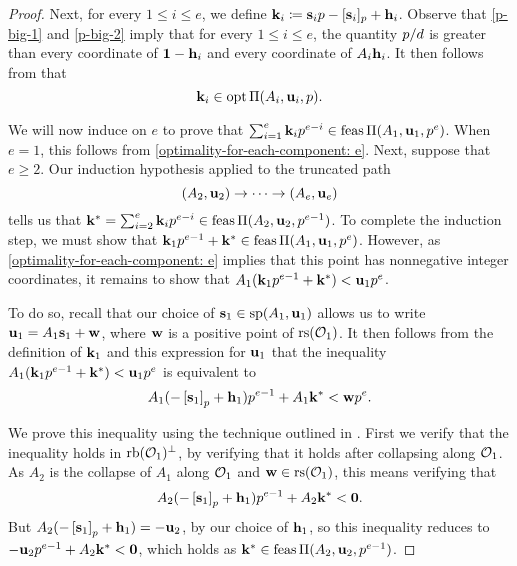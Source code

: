 \documentclass{amsart}
\begin{document}
\begin{proof}
    Next, for every $1 \leq i \leq e$,  we define $\mathbf{k}_i \coloneqq \mathbf{s}_i p - [\mathbf{s}_i]_p + \mathbf{h}_i$.
    Observe that \eqref{p-big-1} and \eqref{p-big-2} imply that for every $1 \leq i \leq e$, the quantity $p/d$ is greater than every coordinate of $\mathbf{1}-\mathbf{h}_i$ and every coordinate of $A_i \mathbf{h}_i$.
    It then follows from  that
    \begin{equation}
       \label{optimality-for-each-component: e}
       \mathbf{k}_i \in \operatorname{opt} \Pi(A_i, \mathbf{u}_i,p).
    \end{equation}

    We will now induce on $e$ to prove that $\sum_{i=1}^e \mathbf{k}_i p^{e-i} \in \operatorname{feas}\Pi(A_1, \mathbf{u}_1, p^e)$.
    When $e = 1$, this follows from \eqref{optimality-for-each-component: e}.
    Next, suppose that $e \geq 2$.
    Our induction hypothesis applied to the truncated path
    \[ (A_2, \mathbf{u}_2) \to \cdots \to (A_e, \mathbf{u}_e) \]
    tells us that $\mathbf{k}^{\ast} = \sum_{i=2}^e \mathbf{k}_i p^{e-i} \in \operatorname{feas} \Pi(A_2, \mathbf{u}_2, p^{e-1})$.
    To complete the induction step, we must show that $\mathbf{k}_1 p^{e-1} + \mathbf{k}^{\ast} \in \operatorname{feas}\Pi(A_1, \mathbf{u}_1, p^e)$.
    However, as \eqref{optimality-for-each-component: e} implies that this point has nonnegative integer coordinates, it remains to show that $A_1 ( \mathbf{k}_1 p^{e-1} + \mathbf{k}^{\ast} ) < \mathbf{u}_1 p^e$.

    To do so, recall that our choice of $\mathbf{s}_1 \in \operatorname{sp}(A_1, \mathbf{u}_1)$ allows us to write $\mathbf{u}_1 = A_1 \mathbf{s}_1 + \mathbf{w}$, where $\mathbf{w}$ is a positive point of $\operatorname{rs}(\mathcal{O}_1)$.
    It then follows from the definition of $\mathbf{k}_1$ and this expression for $\mathbf{u}_1$ that the inequality $A_1 ( \mathbf{k}_1 p^{e-1} + \mathbf{k}^{\ast} ) < \mathbf{u}_1 p^e$ is equivalent to
    \begin{equation}
       \label{target-inequality: e}
       A_1( - \left[ \mathbf{s}_1 \right]_p + \mathbf{h}_1 ) p^{e-1} + A_1\mathbf{k}^{\ast} < \mathbf{w} p^e.
    \end{equation}

    We prove this inequality using the technique outlined in .
    First we verify that the inequality holds in $\operatorname{rb}(\mathcal{O}_1)^{\perp}$, by verifying that it holds after collapsing along $\mathcal{O}_1$.
    As $A_2$ is the collapse of $A_1$ along $\mathcal{O}_1$ and $\mathbf{w}\in \operatorname{rs}(\mathcal{O}_1)$, this means verifying that
    \[A_2( - \left[ \mathbf{s}_1 \right]_p + \mathbf{h}_1 ) p^{e-1} + A_2\mathbf{k}^{\ast} < \mathbf{0}.\]
    But $A_2( - \left[ \mathbf{s}_1 \right]_p + \mathbf{h}_1 ) = -\mathbf{u}_2$, by our choice of $\mathbf{h}_1$, so this inequality reduces to $-\mathbf{u}_2 p^{e-1} + A_2 \mathbf{k}^{\ast} < \mathbf{0}$, which holds as $\mathbf{k}^{\ast} \in \operatorname{feas} \Pi(A_2, \mathbf{u}_2, p^{e-1})$.


\end{proof}
\end{document}

